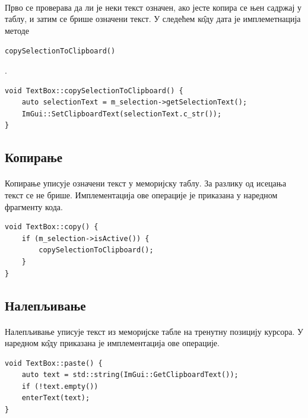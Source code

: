 \documentclass[12pt,oneside]{memoir}
\begin{document}
\paragraph{}
Прво се проверава да ли је неки текст означен, ако јесте копира се њен садржај у
таблу, и затим се брише означени текст. У следећем к\^{о}ду дата је имплеметнација
методе \begin{latinica}\verb|copySelectionToClipboard()|\end{latinica}.

\begin{verbatim}
void TextBox::copySelectionToClipboard() {
	auto selectionText = m_selection->getSelectionText();
	ImGui::SetClipboardText(selectionText.c_str());
}
\end{verbatim}

\subsection{Копирање}
\paragraph{}
Копирање уписује означени текст у меморијску таблу. За разлику од исецања текст 
се не брише. Имплементација ове операције је приказана у наредном фрагменту кода.

\begin{verbatim}
void TextBox::copy() {
	if (m_selection->isActive()) {
		copySelectionToClipboard();
	}
}
\end{verbatim}

\subsection{Налепљивање}
\paragraph{}
Налепљивање уписује текст из меморијске табле на тренутну позицију курсора. 
У наредном к\^{о}ду приказана је имплементација ове операције.

\begin{verbatim}
void TextBox::paste() {
	auto text = std::string(ImGui::GetClipboardText());
	if (!text.empty())
	enterText(text);
}
\end{verbatim}


\end{document}
